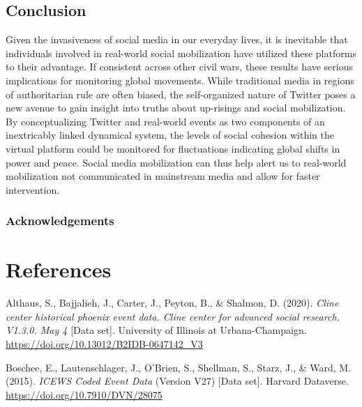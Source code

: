 \documentclass[english,man]{apa6}
\begin{document}
\hypertarget{conclusion}{%
\subsection{Conclusion}\label{conclusion}}

Given the invasiveness of social media in our everyday lives, it is inevitable that individuals involved in real-world social mobilization have utilized these platforms to their advantage. If consistent across other civil wars, these results have serious implications for monitoring global movements. While traditional media in regions of authoritarian rule are often biased, the self-organized nature of Twitter poses a new avenue to gain insight into truths about up-risings and social mobilization. By conceptualizing Twitter and real-world events as two components of an inextricably linked dynamical system, the levels of social cohesion within the virtual platform could be monitored for fluctuations indicating global shifts in power and peace. Social media mobilization can thus help alert us to real-world mobilization not communicated in mainstream media and allow for faster intervention.

\hypertarget{acknowledgements}{%
\subsubsection{Acknowledgements}\label{acknowledgements}}

\newpage

\hypertarget{references}{%
\section{References}\label{references}}

\begingroup
\setlength{\parindent}{-0.5in}
\setlength{\leftskip}{0.5in}

\hypertarget{refs}{}
\leavevmode\hypertarget{ref-illinoisdatabankIDB-2796521}{}%
Althaus, S., Bajjalieh, J., Carter, J., Peyton, B., \& Shalmon, D. (2020). \emph{Cline center historical phoenix event data. Cline center for advanced social research. V1.3.0. May 4} {[}Data set{]}. University of Illinois at Urbana-Champaign. \url{https://doi.org/10.13012/B2IDB-0647142_V3}

\leavevmode\hypertarget{ref-DVNux2f28075_2015}{}%
Boschee, E., Lautenschlager, J., O'Brien, S., Shellman, S., Starz, J., \& Ward, M. (2015). \emph{ICEWS Coded Event Data} (Version V27) {[}Data set{]}. Harvard Dataverse. \url{https://doi.org/10.7910/DVN/28075}
\end{document}
